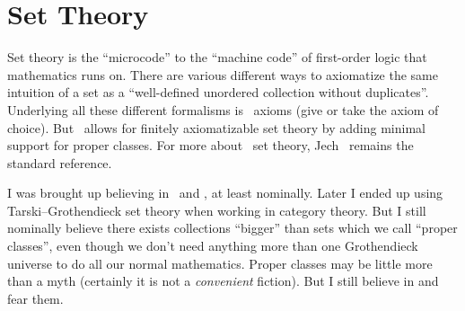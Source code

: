 \chapter{Set Theory}

\begin{node}\label{set-0000}%
Set theory is the ``microcode'' to the ``machine code'' of first-order
logic that mathematics runs on. There are various different ways to
axiomatize the same intuition of a set as a ``well-defined unordered
collection without duplicates''. Underlying all these different
formalisms is \ZFC\ axioms (give or take the axiom of choice). But
\NBG\ allows for finitely axiomatizable set theory by adding minimal
support for proper classes. For more about \ZFC\ set theory,
Jech~\cite{jech2003set} remains the standard reference.
\end{node}

\begin{node}[Classes]\label{set-0003}%
I was brought up believing in \ZFC\ and \NBG, at least nominally. Later
I ended up using Tarski--Grothendieck set theory when working in
category theory. But I still nominally believe there exists collections
``bigger'' than sets which we call ``proper classes'', even though we
don't need anything more than one Grothendieck universe to do all our
normal mathematics. Proper classes may be little more than a myth
(certainly it is not a \emph{convenient} fiction). But I still believe in
and fear them.
\end{node}



